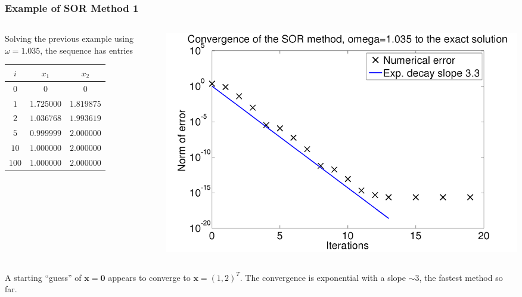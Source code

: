 \documentclass{beamer}
\newcommand{\bx}{{\boldsymbol{x}}}
\newcommand{\bfm}[1]{{\boldsymbol{#1}}}
\begin{document}
\begin{frame}
  \frametitle{Example of SOR Method 1}

  \begin{columns}
    \begin{column}{0.475\textwidth}
      Solving the previous example using $\omega = 1.035$, the
      sequence has entries
      \begin{tabular}{|c|c c|}
        $i$ & $x_1$ & $x_2$ \\ \hline
        $0$ & $0$ & $0$ \\
        $1$ & $1.725000$ & $1.819875$ \\
        $2$ & $1.036768$ & $1.993619$ \\
        $5$ & $0.999999$ & $2.000000$ \\
        $10$ & $1.000000$ & $2.000000$ \\
        $100$ & $1.000000$ & $2.000000$
      \end{tabular}
    \end{column}
    \begin{column}{0.525\textwidth}
      \begin{center}
        \includegraphics[width=\textwidth]{figures/SOR1}
      \end{center}
    \end{column}
  \end{columns}

  \vspace{1ex}

  A starting ``guess'' of $\bx = \bfm{0}$ appears to converge to $\bx
  = (1, 2)^T$. The convergence is exponential with a slope $\sim 3$,
  the fastest method so far.

\end{frame}
\end{document}
